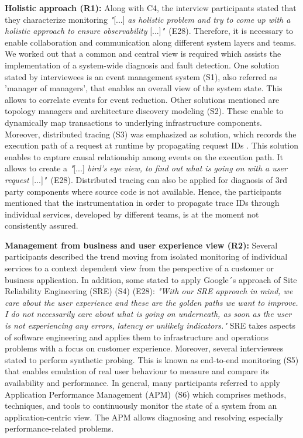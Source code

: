 \documentclass[runningheads]{llncs}
\begin{document}
\textbf{Holistic approach (R1):} Along with C4, the interview participants stated that they characterize monitoring \textit{"}[...] \textit{as holistic problem and try to come up with a holistic approach to ensure observability} [...]\textit{"}~(E28). Therefore, it is necessary to enable collaboration and communication along different system layers and teams. We worked out that a common and central view is required which assists the implementation of a system-wide diagnosis and fault detection. One solution stated by interviewees is an event management system (S1), also referred as 'manager of managers', that enables an overall view of the system state. This allows to correlate events for event reduction. Other solutions mentioned are topology managers and architecture discovery modeling (S2). These enable to dynamically map transactions to underlying infrastructure components. Moreover, distributed tracing (S3) was emphasized as solution, which records the execution path of a request at runtime by propagating request IDs \cite{sambasivan2016principled}. This solution enables to capture causal relationship among events on the execution path. It allows to create a \textit{"}[...] \textit{bird’s eye view, to find out what is going on with a user request} [...]\textit{"}~(E28). Distributed tracing can also be applied for diagnosis of 3rd party components where source code is not available. Hence, the participants mentioned that the instrumentation in order to propagate trace IDs through individual services, developed by different teams, is at the moment not consistently assured.

\textbf{Management from business and user experience view (R2):}
Several participants described the trend moving from isolated monitoring of individual services to a context dependent view from the perspective of a customer or business application. In addition, some stated to apply Google´s approach of Site Reliability Engineering (SRE) (S4) (E28):
\textit{"With our SRE approach in mind, we care about the user experience and these are the golden paths we want to improve. I do not necessarily care about what is going on underneath, as soon as the user is not experiencing any errors, latency or unlikely indicators."} SRE \cite{beyer2016site} takes aspects of software engineering and applies them to infrastructure and operations problems with a focus on customer experience. Moreover, several interviewees stated to perform synthetic probing. This is known as end-to-end monitoring (S5) that enables emulation of real user behaviour to measure and compare its availability and performance. In general, many participants referred to apply Application Performance Management (APM)~(S6) which comprises methods, techniques, and tools to continuously monitor the state of a system from an application-centric view. The APM allows diagnosing and resolving especially performance-related problems. 
\end{document}

